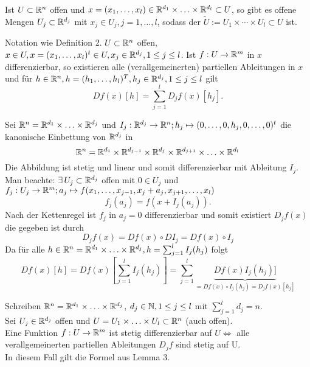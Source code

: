 \documentclass[../ana2.tex]{subfiles}
\begin{document}
\begin{bem}
    Ist \(U \subset \mathbb{R}^n\) offen und 
    \( x = (x_1, \ldots, x_l) 
    \in \mathbb{R}^{d_1} \times \ldots \times \mathbb{R}^{d_l} \subset U \),
    so gibt es offene Mengen \( U_j \subset \mathbb{R}^{d_j} \) 
    mit \( x_j \in U_j, j = 1,\ldots, l \), sodass 
    der  \( \tilde{U} := U_1 \times \cdots \times U_l \subset U \) 
    ist.
\end{bem}
\begin{lem}
    Notation wie Definition 2. \( U \subset \mathbb{R}^n \) 
    offen, \( x \in U, x = (x_1, \ldots, x_l)^t \in U, 
    x_j \in \mathbb{R}^{d_j}, 1 \leq j \leq l \).
    Ist \(f:U\rightarrow \mathbb{R}^m\) in \(x\) differenzierbar,
    so existieren alle (verallgemeinerten) partiellen 
    Ableitungen in \( x \) und für \( h \in \mathbb{R}^n, 
    h = (h_1, \ldots, h_l)^T, h_j \in \mathbb{R}^{d_j}, 1 \leq j \leq l \) 
    gilt 
    \[ Df(x)[h] = \sum_{j=1}^l D_j f(x)[h_j]. \]
\end{lem}
\begin{bew}
    Sei \(\mathbb{R}^n = \mathbb{R}^{d_1} \times \ldots \times \mathbb{R}^{d_j}\) und
    \( I_j:\mathbb{R}^{d_j}\rightarrow \mathbb{R}^n; h_j \mapsto (0, \ldots, 0, h_j, 0, \ldots, 0)^t \) 
    die kanonische Einbettung von \(\mathbb{R}^{d_j}\) in
    \[\mathbb{R}^n = \mathbb{R}^{d_1} \times \mathbb{R}^{d_{j-1}} \times \mathbb{R}^{d_j} 
    \times \mathbb{R}^{d_{j+1}} \times \ldots \times \mathbb{R}^{d_l}\]
    Die Abbildung ist stetig und linear und somit 
    differenzierbar mit Ableitung \( I_j \).\\
    Man beachte: \( \exists U_j \subset \R^{d_j} \) offen mit \(0 \in U_j\)
    und \(f_j:U_j\rightarrow \mathbb{R}^m; 
    a_j \mapsto f(x_1, \ldots, x_{j-1}, x_j + a_j, x_{j+1}, \ldots, x_l)\)
    \[ f_j(a_j) = f(x + I_j(a_j)). \]
    Nach der Kettenregel ist \( f_j \) in \( a_j = 0 \) 
    differenzierbar und somit existiert \( D_j f(x) \) 
    die gegeben ist durch 
    \[ D_j f(x) = Df(x) \circ DI_j 
    = Df(x) \circ I_j \tag{\(*\)} \]
    Da für alle \(h \in \mathbb{R}^n = \mathbb{R}^{d_1} \times \ldots \times \mathbb{R}^{d_j},
    h = \sum_{j=1}^l I_j(h_j) \) folgt
    \[ Df(x)[h] = Df(x)[\sum_{j=1}^l I_j(h_j)]
    = \sum_{j=1}^l 
    \underbrace{Df(x)I_j(h_j)]}_{= Df(x) \circ I_j(h_j) = D_jf(x)[h_j]} \]
\end{bew}
\begin{satz}
    Schreiben \( \mathbb{R}^n = \mathbb{R}^{d_1} \times \ldots \times \mathbb{R}^{d_j} \),
    \( d_j \in \mathbb{N} , 1 \leq j \leq l \) mit \( \sum_{j=1}^l d_j = n \).\\
    Sei \( U_j \in \mathbb{R}^{d_j} \) offen und 
    \( U = U_1 \times \ldots \times U_l \subset \mathbb{R}^n \) (auch offen).\\
    Eine Funktion \( f:U\rightarrow \mathbb{R}^m \) ist stetig differenzierbar auf 
    \( U \Leftrightarrow \) alle verallgemeinerten partiellen Ableitungen 
    \( D_jf \) sind stetig auf U.\\
    In diesem Fall gilt die Formel aus Lemma 3.
\end{satz}
\end{document}
